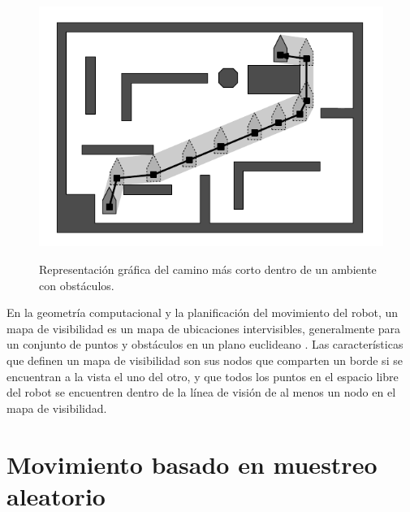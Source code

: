 \begin{figure}%
\centering \footnotesize
 {\includegraphics[width=0.60\linewidth]{images/short_path.png}}
 \captionsetup{font=footnotesize}
 \caption{Representaci\'on gr\'afica del camino m\'as corto dentro de un ambiente con obst\'aculos.}
\label{f:shortPath}
\end{figure}

En la geometr\'ia computacional y la planificaci\'on del movimiento del robot, un mapa de visibilidad es un mapa de ubicaciones intervisibles, generalmente para un conjunto de puntos y obst\'aculos en un plano euclideano \cite{wikiVisibilityGraph}. Las caracter\'isticas que definen un mapa de visibilidad son sus nodos que comparten un borde si se encuentran a la vista el uno del otro, y que todos los puntos en el espacio libre del robot se encuentren dentro de la l\'inea de visi\'on de al menos un nodo en el mapa de visibilidad. 



\section{Movimiento basado en muestreo aleatorio}




